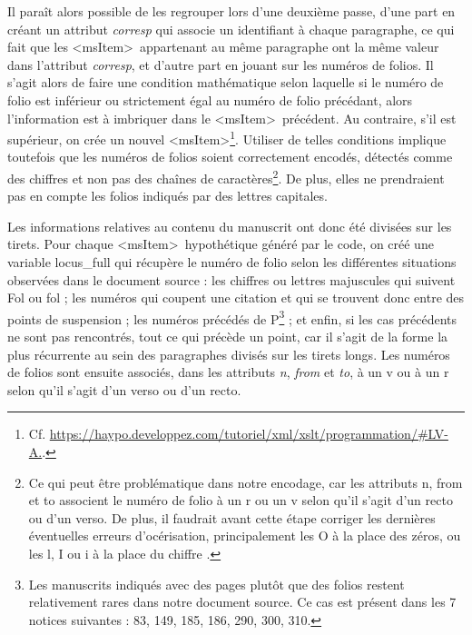 \documentclass[a4paper,12pt,twoside]{book}
\begin{document}
Il paraît alors possible de les regrouper lors d’une deuxième passe, d'une part en créant un attribut \textit{corresp} qui associe un identifiant à chaque paragraphe, ce qui fait que les \textless msItem\textgreater~appartenant au même paragraphe ont la même valeur dans l'attribut \textit{corresp}, et d'autre part en jouant sur les numéros de folios. Il s'agit alors de faire une condition mathématique selon laquelle si le numéro de folio est inférieur ou strictement égal au numéro de folio précédant, alors l'information est à imbriquer dans le \textless msItem\textgreater~précédent. Au contraire, s'il est supérieur, on crée un nouvel \textless msItem\textgreater\footnote{Cf. \url{https://haypo.developpez.com/tutoriel/xml/xslt/programmation/#LV-A.}.}. Utiliser de telles conditions implique toutefois que les numéros de folios soient correctement encodés, détectés comme des chiffres et non pas des chaînes de caractères\footnote{Ce qui peut être problématique dans notre encodage, car les attributs n, from et to associent le numéro de folio à un \og r\fg{} ou un \og v\fg{} selon qu'il s'agit d'un recto ou d'un verso. De plus, il faudrait avant cette étape corriger les dernières éventuelles erreurs d'océrisation, principalement les \og O\fg{} à la place des zéros, ou les \og l\fg{}, \og I\fg{} ou \og i\fg{} à la place du chiffre \fg{}.}. De plus, elles ne prendraient pas en compte les folios indiqués par des lettres capitales.

Les informations relatives au contenu du manuscrit ont donc été divisées sur les tirets. Pour chaque \textless msItem\textgreater~hypothétique généré par le code, on créé une variable \og locus\_full\fg{} qui récupère le numéro de folio selon les différentes situations observées dans le document source : les chiffres ou lettres majuscules qui suivent \og Fol\fg{} ou \og fol\fg{} ; les numéros qui coupent une citation et qui se trouvent donc entre des points de suspension ; les numéros précédés de \og P\fg{}\footnote{Les manuscrits indiqués avec des pages plutôt que des folios restent relativement rares dans notre document source. Ce cas est présent dans les 7 notices suivantes : 83, 149, 185, 186, 290, 300, 310.} ; et enfin, si les cas précédents ne sont pas rencontrés, tout ce qui précède un point, car il s'agit de la forme la plus récurrente au sein des paragraphes divisés sur les tirets longs. Les numéros de folios sont ensuite associés, dans les attributs \textit{n}, \textit{from} et \textit{to}, à un \og v\fg{} ou à un \og r\fg{} selon qu'il s'agit d'un verso ou d'un recto. 
\end{document}

